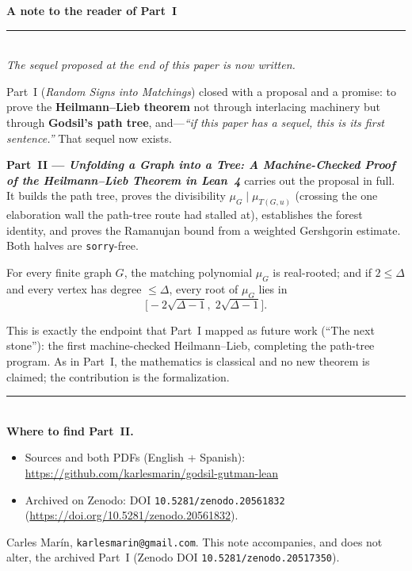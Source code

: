 \documentclass[11pt]{article}
\newcommand{\lean}[1]{\texttt{#1}}
\begin{document}
{\centering
{\large\bfseries A note to the reader of Part~I}\\[2pt]
{\color{ggteal}\rule{0.5\textwidth}{0.8pt}}\\[6pt]
{\itshape The sequel proposed at the end of this paper is now written.}\\[14pt]
}

Part~I (\emph{Random Signs into Matchings}) closed with a proposal and a promise:
to prove the \textbf{Heilmann--Lieb theorem} not through interlacing machinery but
through \textbf{Godsil's path tree}, and---\emph{``if this paper has a sequel, this
is its first sentence.''} That sequel now exists.

\textbf{Part~II --- \emph{Unfolding a Graph into a Tree: A Machine-Checked Proof of
the Heilmann--Lieb Theorem in Lean~4}} carries out the proposal in full. It builds
the path tree, proves the divisibility $\mu_G \mid \mu_{T(G,u)}$ (crossing the one
elaboration wall the path-tree route had stalled at), establishes the forest
identity, and proves the Ramanujan bound from a weighted Gershgorin estimate. Both
halves are \lean{sorry}-free.

\begin{tcolorbox}[colframe=ggteal,colback=ggband!40,arc=3pt,boxrule=0.9pt]
\centering
For every finite graph $G$, the matching polynomial $\mu_G$ is real-rooted; and if
$2\le\Delta$ and every vertex has degree $\le\Delta$, every root of $\mu_G$ lies in
\[
  \bigl[-2\sqrt{\Delta-1},\;2\sqrt{\Delta-1}\bigr].
\]
\end{tcolorbox}

This is exactly the endpoint that Part~I mapped as future work
(``The next stone''): the first machine-checked Heilmann--Lieb, completing the
path-tree program. As in Part~I, the mathematics is classical and no new theorem is
claimed; the contribution is the formalization.

\bigskip
{\color{ggteal}\rule{\textwidth}{0.4pt}}\\[4pt]
\textbf{Where to find Part~II.}
\begin{itemize}\setlength{\itemsep}{1pt}
\item Sources and both PDFs (English + Spanish):
  \url{https://github.com/karlesmarin/godsil-gutman-lean}
\item Archived on Zenodo: DOI \texttt{10.5281/zenodo.20561832}
  (\url{https://doi.org/10.5281/zenodo.20561832}).
\end{itemize}

\vfill
{\footnotesize\color{gray}
Carles Mar\'in, \texttt{karlesmarin@gmail.com}. This note accompanies, and does not
alter, the archived Part~I (Zenodo DOI \texttt{10.5281/zenodo.20517350}).}
\end{document}
